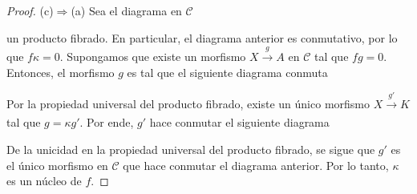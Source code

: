 \documentclass[tesis]{subfiles}
\begin{document}
\begin{proof}
    (c)$\Rightarrow$(a) Sea el diagrama en $\mathscr{C}$
    \begin{center}
    \end{center}
    un producto fibrado. En particular, el diagrama anterior es conmutativo, por lo que $f\kappa=0$. Supongamos que existe un morfismo $X\xrightarrow{g} A$ en $\mathscr{C}$ tal que $fg=0$. Entonces, el morfismo $g$ es tal que el siguiente diagrama conmuta
    \begin{center}
    \end{center}
    Por la propiedad universal del producto fibrado, existe un único morfismo $X\xrightarrow[]{g'} K$ tal que $g=\kappa g'$. Por ende, $g'$ hace conmutar el siguiente diagrama
    \begin{center}
    \end{center}
    De la unicidad en la propiedad universal del producto fibrado, se sigue que $g'$ es el único morfismo en $\mathscr{C}$ que hace conmutar el diagrama anterior. Por lo tanto, $\kappa$ es un núcleo de $f$. 
\end{proof}
\end{document}

